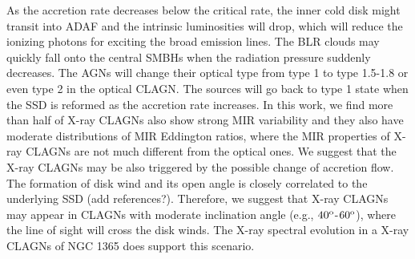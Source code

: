 \documentclass[linenumbers]{aastex631}
\begin{document}
As the accretion rate decreases below the critical rate, the inner cold disk might transit into ADAF and the intrinsic luminosities will drop, which will reduce the ionizing photons for exciting the broad emission lines. The BLR clouds may quickly fall onto the central SMBHs when the radiation pressure suddenly decreases. The AGNs will change their optical type from type 1 to type 1.5-1.8 or even type 2 in the optical CLAGN. The sources will go back to type 1 state when the SSD is reformed as the accretion rate increases. In this work, we find more than half of X-ray CLAGNs also show strong MIR variability and they also have moderate distributions of MIR Eddington ratios, where the MIR properties of X-ray CLAGNs are not much different from the optical ones. We suggest that the X-ray CLAGNs may be also triggered by the possible change of accretion flow. The formation of disk wind and its open angle is closely correlated to the underlying SSD {\color{red}(add references?)}. Therefore, we suggest that X-ray CLAGNs may appear in CLAGNs with moderate inclination angle (e.g., $40^{\rm o}$-$60^{\rm o}$), where the line of sight will cross the disk winds. The X-ray spectral evolution in a X-ray CLAGNs of NGC 1365 does support this scenario\citep[e.g.,][]{2014MNRAS.440.3503C,2021RAA....21..199L}.
\end{document}
